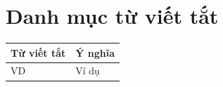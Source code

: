 \chapter*{Danh mục từ viết tắt}

\begin{tabular}{ll}
\textbf{Từ viết tắt} & \textbf{Ý nghĩa} \\
\hline
VD & Ví dụ \\
\end{tabular}
